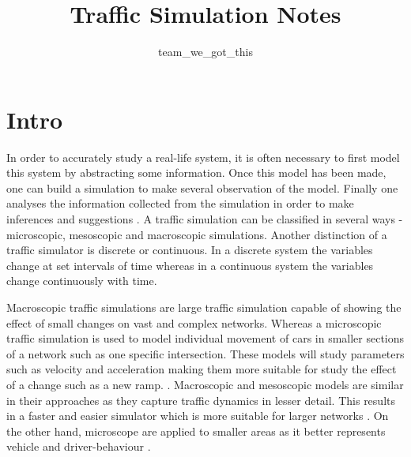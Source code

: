 \documentclass[]{article}
\title{Traffic Simulation Notes}
\author{team\_we\_got\_this}
\begin{document}
\maketitle


\section*{Intro}

In order to accurately study a real-life system, it is often necessary to first model this system by abstracting some information. Once this model has been made, one can build a simulation to make several observation of the model. Finally one analyses the information collected from the simulation in order to make inferences and suggestions \cite{sokolowski2011principles}. A traffic simulation can be classified in several ways - microscopic, mesoscopic and macroscopic simulations. Another distinction of a traffic simulator is discrete or continuous. In a discrete system the variables change at set intervals of time whereas in a continuous system the variables change continuously with time. 

Macroscopic traffic simulations are large traffic simulation capable of showing the effect of small changes on vast and complex networks. Whereas a microscopic traffic simulation is used to model individual movement of cars  in smaller sections of a network such as one specific intersection. These models will study parameters such as velocity and acceleration making them more suitable for study the effect of a change such as a new ramp. \cite{sokolowski2011principles}. Macroscopic and mesoscopic models are similar in their approaches as they capture traffic dynamics in lesser detail. This results in a faster and easier simulator which is more suitable for larger networks . 
On the other hand, microscope are applied to smaller areas as it better represents vehicle and driver-behaviour \cite{burghout2005hybrid}. 



\end{document}
